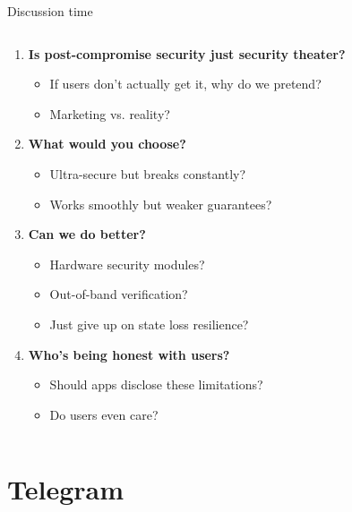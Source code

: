 \documentclass[aspectratio=169, lualatex, handout]{beamer}
\begin{document}
\begin{frame}{Discussion time}
	\begin{columns}[c]
		\begin{column}{0.7\textwidth}
			\begin{enumerate}
				\item \textbf{Is post-compromise security just security theater?}
				      \begin{itemize}
					      \item If users don't actually get it, why do we pretend?
					      \item Marketing vs. reality?
				      \end{itemize}
				\item \textbf{What would you choose?}
				      \begin{itemize}
					      \item Ultra-secure but breaks constantly?
					      \item Works smoothly but weaker guarantees?
				      \end{itemize}
				\item \textbf{Can we do better?}
				      \begin{itemize}
					      \item Hardware security modules?
					      \item Out-of-band verification?
					      \item Just give up on state loss resilience?
				      \end{itemize}
				\item \textbf{Who's being honest with users?}
				      \begin{itemize}
					      \item Should apps disclose these limitations?
					      \item Do users even care?
				      \end{itemize}
			\end{enumerate}
		\end{column}
		\begin{column}{0.3\textwidth}
		\end{column}
	\end{columns}
\end{frame}

\section{Telegram}
\end{document}
